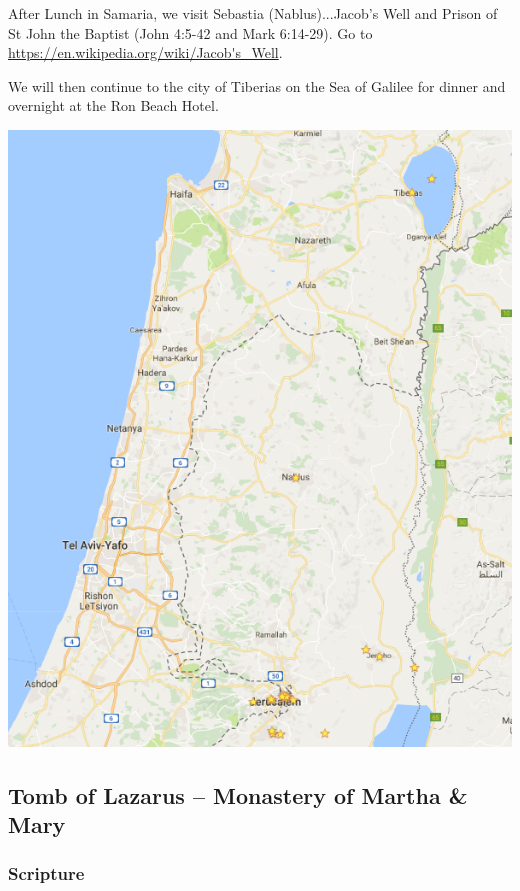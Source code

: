 \documentclass[letterpaper]{report}
\begin{document}
After Lunch in Samaria, we visit Sebastia (Nablus)...Jacob's
Well and Prison of St John the Baptist (John 4:5-42 and Mark 6:14-29). Go to
\url{https://en.wikipedia.org/wiki/Jacob's_Well}.

We will then continue to the city of Tiberias on the Sea of Galilee for dinner 
and overnight at the Ron Beach Hotel.

\includegraphics[height=\textheight]{JerusalemSeaOfGalile}


\clearpage
\subsection{Tomb of Lazarus -- Monastery of Martha \& Mary}
\begin{multicols}{2}
	\mbox{}
\end{multicols}
\subsubsection{Scripture}
\end{document}
